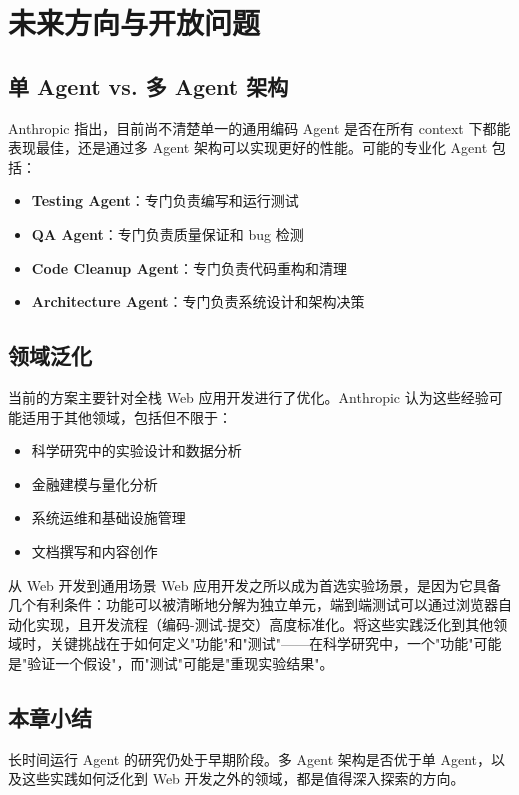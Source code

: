 \section{未来方向与开放问题}

\subsection{单 Agent vs. 多 Agent 架构}

Anthropic 指出，目前尚不清楚单一的通用编码 Agent 是否在所有 context 下都能表现最佳，还是通过多 Agent 架构可以实现更好的性能。可能的专业化 Agent 包括：

\begin{itemize}
    \item \textbf{Testing Agent}：专门负责编写和运行测试
    \item \textbf{QA Agent}：专门负责质量保证和 bug 检测
    \item \textbf{Code Cleanup Agent}：专门负责代码重构和清理
    \item \textbf{Architecture Agent}：专门负责系统设计和架构决策
\end{itemize}

\subsection{领域泛化}

当前的方案主要针对全栈 Web 应用开发进行了优化。Anthropic 认为这些经验可能适用于其他领域，包括但不限于：

\begin{itemize}
    \item 科学研究中的实验设计和数据分析
    \item 金融建模与量化分析
    \item 系统运维和基础设施管理
    \item 文档撰写和内容创作
\end{itemize}

\begin{knowledgebox}{从 Web 开发到通用场景}
Web 应用开发之所以成为首选实验场景，是因为它具备几个有利条件：功能可以被清晰地分解为独立单元，端到端测试可以通过浏览器自动化实现，且开发流程（编码-测试-提交）高度标准化。将这些实践泛化到其他领域时，关键挑战在于如何定义"功能"和"测试"——在科学研究中，一个"功能"可能是"验证一个假设"，而"测试"可能是"重现实验结果"。
\end{knowledgebox}

\subsection{本章小结}

长时间运行 Agent 的研究仍处于早期阶段。多 Agent 架构是否优于单 Agent，以及这些实践如何泛化到 Web 开发之外的领域，都是值得深入探索的方向。


